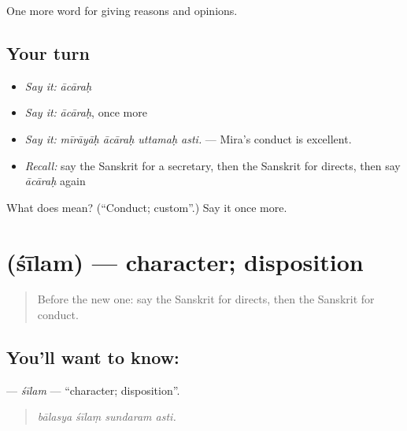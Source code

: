 \begin{grammarlens}[title={What you've built}]
One more word for giving reasons and opinions.
\end{grammarlens}

\subsection*{Your turn}
\begin{itemize}
\raggedright
  \item \emph{Say it:} \emph{ācāraḥ}
  \item \emph{Say it:} \emph{ācāraḥ}, once more
  \item \emph{Say it:} \emph{mīrāyāḥ ācāraḥ uttamaḥ asti.} — Mira's conduct is excellent.
  \item \emph{Recall:} say the Sanskrit for a secretary, then the Sanskrit for directs, then say \emph{ācāraḥ} again
\end{itemize}

\begin{tcolorbox}[breakable,colback=teal!4,colframe=teal!35!black,title={Before you move on}]
What does  mean? (\textquotedblleft{}Conduct; custom\textquotedblright{}.) Say it once more.
\end{tcolorbox}
\section[\texorpdfstring{\sk{शीलम्} (śīlam)}{शीलम् (śīlam)}]{ (śīlam) — character; disposition}

\label{lesson:SA-C358-silam}



\begin{quote}
Before the new one: say the Sanskrit for directs, then the Sanskrit for conduct.
\end{quote}

\subsection*{You'll want to know: }
\textbf{} — \emph{śīlam} — \textquotedblleft{}character; disposition\textquotedblright{}.

\begin{quote}
   
\end{quote}

\begin{quote}
\emph{bālasya śīlaṃ sundaram asti.}
\end{quote}

